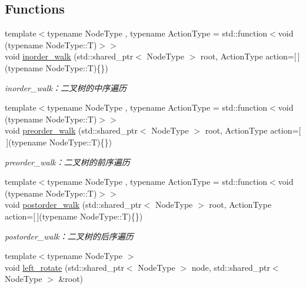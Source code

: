 \subsection*{Functions}
\begin{DoxyCompactItemize}
\item 
{\footnotesize template$<$typename Node\+Type , typename Action\+Type  = std\+::function$<$void (typename Node\+Type\+::\+T)$>$$>$ }\\void \hyperlink{namespace_introduction_to_algorithm_1_1_tree_algorithm_abd9431ca8d1a40f70b6c72c732fc5892}{inorder\+\_\+walk} (std\+::shared\+\_\+ptr$<$ Node\+Type $>$ root, Action\+Type action=\mbox{[}$\,$\mbox{]}(typename Node\+Type\+::\+T)\{\})
\begin{DoxyCompactList}\small\item\em inorder\+\_\+walk：二叉树的中序遍历 \end{DoxyCompactList}\item 
{\footnotesize template$<$typename Node\+Type , typename Action\+Type  = std\+::function$<$void (typename Node\+Type\+::\+T)$>$$>$ }\\void \hyperlink{namespace_introduction_to_algorithm_1_1_tree_algorithm_a3d57267cd5fea456f6e001dc22d07c85}{preorder\+\_\+walk} (std\+::shared\+\_\+ptr$<$ Node\+Type $>$ root, Action\+Type action=\mbox{[}$\,$\mbox{]}(typename Node\+Type\+::\+T)\{\})
\begin{DoxyCompactList}\small\item\em preorder\+\_\+walk：二叉树的前序遍历 \end{DoxyCompactList}\item 
{\footnotesize template$<$typename Node\+Type , typename Action\+Type  = std\+::function$<$void (typename Node\+Type\+::\+T)$>$$>$ }\\void \hyperlink{namespace_introduction_to_algorithm_1_1_tree_algorithm_a49b5467191bd51c25ad7e7bfbed51339}{postorder\+\_\+walk} (std\+::shared\+\_\+ptr$<$ Node\+Type $>$ root, Action\+Type action=\mbox{[}$\,$\mbox{]}(typename Node\+Type\+::\+T)\{\})
\begin{DoxyCompactList}\small\item\em postorder\+\_\+walk：二叉树的后序遍历 \end{DoxyCompactList}\item 
{\footnotesize template$<$typename Node\+Type $>$ }\\void \hyperlink{namespace_introduction_to_algorithm_1_1_tree_algorithm_a96be2938a006ec461c1b0a59d6bee3b5}{left\+\_\+rotate} (std\+::shared\+\_\+ptr$<$ Node\+Type $>$ node, std\+::shared\+\_\+ptr$<$ Node\+Type $>$ \&root)

\end{DoxyCompactItemize}
